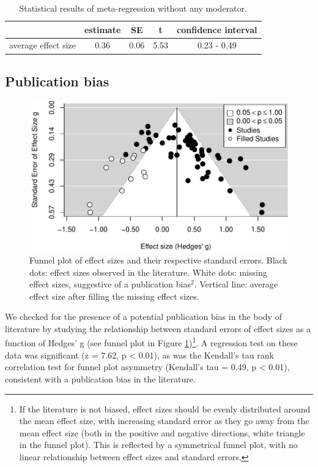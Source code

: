 \documentclass[
  man]{apa6}
\begin{document}
\begin{table}[tbp]
\begin{center}
\begin{threeparttable}
\caption{\label{tab:Table1}Statistical results of meta-regression without any moderator.}
\begin{tabular}{lcccc}
\toprule
 & estimate & SE & t & confidence interval\\
\midrule
average effect size & 0.36 & 0.06 & 5.53 & 0.23 - 0.49\\
\bottomrule
\end{tabular}
\end{threeparttable}
\end{center}
\end{table}

\hypertarget{publication-bias}{%
\subsection{Publication bias}\label{publication-bias}}

\begin{figure}
\centering
\includegraphics{MA_speech_pref_files/figure-latex/bias-1.pdf}
\caption{\label{fig:bias}Funnel plot of effect sizes and their respective standard errors. Black dots: effect sizes observed in the literature. White dots: missing effect sizes, suggestive of a publication bias\(^2\). Vertical line: average effect size after filling the missing effect sizes.}
\end{figure}

We checked for the presence of a potential publication bias in the body of literature by studying the relationship between standard errors of effect sizes as a function of Hedges' g (see funnel plot in Figure \ref{fig:bias})\footnote{If the literature is not biased, effect sizes should be evenly distributed around the mean effect size, with increasing standard error as they go away from the mean effect size (both in the positive and negative directions, white triangle in the funnel plot). This is reflected by a symmetrical funnel plot, with no linear relationship between effect sizes and standard errors.}. A regression test on these data was significant (z = 7.62, p \textless{} 0.01), as was the Kendall's tau rank correlation test for funnel plot asymmetry (Kendall's tau = 0.49, p \textless{} 0.01), consistent with a publication bias in the literature.
\end{document}
